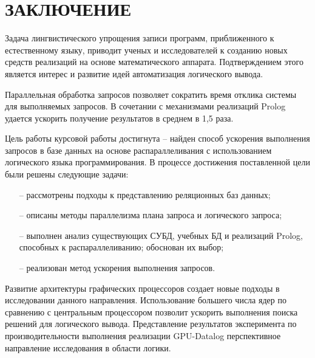\chapter*{\hfill{\centering ЗАКЛЮЧЕНИЕ}\hfill}

Задача лингвистического упрощения записи программ, приближенного к естественному языку, приводит ученых и исследователей к созданию новых средств реализаций на основе математического аппарата. Подтверждением этого является интерес и развитие идей автоматизация логического вывода.

Параллельная обработка запросов позволяет сократить время отклика системы для выполняемых запросов. В сочетании с механизмами реализаций Prolog удается ускорить получение результатов в среднем в 1,5 раза.

Цель работы курсовой работы достигнута -- найден способ ускорения выполнения запросов в базе данных на основе распараллеливания с использованием логического языка программирования. В процессе достижения поставленной цели были решены следующие задачи:
\begin{itemize}
    \item [--] рассмотрены подходы к представлению реляционных баз данных;
    \item [--] описаны методы параллелизма плана запроса и логического запроса;
    \item [--] выполнен анализ существующих СУБД, учебных БД и реализаций  Prolog, способных к распараллеливанию; обоснован их выбор;
    \item [--] реализован метод ускорения выполнения запросов.
\end{itemize}

Развитие архитектуры графических процессоров создает новые подходы
в исследовании данного направления. Использование большего числа ядер
по сравнению с центральным процессором позволит ускорить выполнения
поиска решений для логического вывода. Представление результатов эксперимента по производительности выполнения реализации GPU-Datalog \cite{gpu_datalog} перспективное направление исследования в области логики.